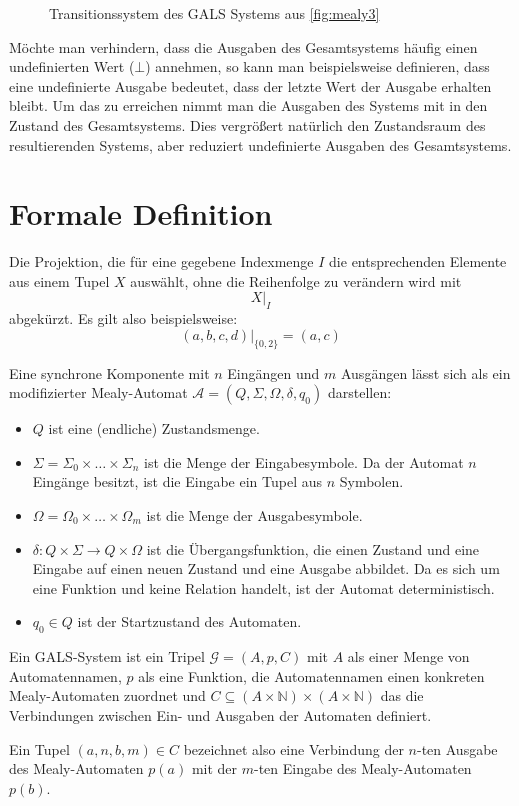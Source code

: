 \begin{figure}[h]
  \centering
  
  \caption{Transitionssystem des GALS Systems aus \ref{fig:mealy3}}
  \label{fig:gals_trans}
\end{figure}

Möchte man verhindern, dass die Ausgaben des Gesamtsystems häufig einen undefinierten Wert ($\bot$) annehmen, so kann man beispielsweise definieren, dass eine undefinierte Ausgabe bedeutet, dass der letzte Wert der Ausgabe erhalten bleibt.
Um das zu erreichen nimmt man die Ausgaben des Systems mit in den Zustand des Gesamtsystems.
Dies vergrößert natürlich den Zustandsraum des resultierenden Systems, aber reduziert undefinierte Ausgaben des Gesamtsystems.

\section{Formale Definition}
\begin{notation}
  Die Projektion, die für eine gegebene Indexmenge $I$ die entsprechenden Elemente aus einem Tupel $X$ auswählt, ohne die Reihenfolge zu verändern wird mit
  \[ X |_I \]
  abgekürzt.
  Es gilt also beispielsweise:
  \[ (a,b,c,d) |_{\{0,2\}} = (a,c) \]
\end{notation}
\label{sec:gals_formal_definition}
Eine synchrone Komponente mit $n$ Eingängen und $m$ Ausgängen lässt sich als ein modifizierter Mealy-Automat $\mathcal{A} = (Q,\Sigma,\Omega,\delta,q_0)$ darstellen:
\begin{itemize}
  \item $Q$ ist eine (endliche) Zustandsmenge.
  \item $\Sigma = \Sigma_0\times\dots\times\Sigma_n$ ist die Menge der Eingabesymbole.
    Da der Automat $n$ Eingänge besitzt, ist die Eingabe ein Tupel aus $n$ Symbolen.
  \item $\Omega = \Omega_0\times\dots\times\Omega_m$ ist die Menge der Ausgabesymbole.
  \item $\delta : Q\times\Sigma\rightarrow Q\times\Omega$ ist die Übergangsfunktion, die einen Zustand und eine Eingabe auf einen neuen Zustand und eine Ausgabe abbildet.
    Da es sich um eine Funktion und keine Relation handelt, ist der Automat deterministisch.
  \item $q_0\in Q$ ist der Startzustand des Automaten.
\end{itemize}

\begin{definition}
  Ein GALS-System ist ein Tripel $\mathcal{G}=(A,p,C)$ mit $A$ als einer Menge von Automatennamen, $p$ als eine Funktion, die Automatennamen einen konkreten Mealy-Automaten zuordnet und $C\subseteq (A\times\mathbb{N})\times(A\times\mathbb{N})$ das die Verbindungen zwischen Ein- und Ausgaben der Automaten definiert.
\end{definition}
Ein Tupel $(a,n,b,m)\in C$ bezeichnet also eine Verbindung der $n$-ten Ausgabe des Mealy-Automaten $p(a)$ mit der $m$-ten Eingabe des Mealy-Automaten $p(b)$.

